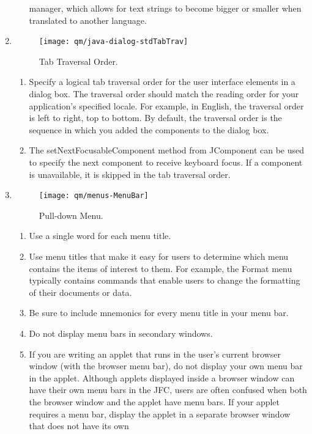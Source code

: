 \begin{enumerate}
\begin{enumerate}
  manager, which allows for text strings to become bigger or smaller when
  translated to another language.
\end{enumerate}
\newpage
\item {}
\begin{figure}[H]
\texttt{[image: qm/java-dialog-stdTabTrav]}
\ifslides
\else
\caption{Tab Traversal Order.}
\fi
\end{figure}
\begin{enumerate}
\item  Specify a logical tab traversal order for the user interface elements
  in a dialog box. The traversal order should match the reading order for your
  application's specified locale. For example, in English, the traversal order
  is left to right, top to bottom. By default, the traversal order is the
  sequence in which you added the components to the dialog box.
\item The setNextFocusableComponent method from JComponent can be used to
  specify the next component to receive keyboard focus. If a component is
  unavailable, it is skipped in the tab traversal order.
\end{enumerate}
\newpage
\item {}
\begin{figure}[H]
\centering
\texttt{[image: qm/menus-MenuBar]}
\caption{Pull-down Menu.}
\end{figure}
\begin{enumerate}
\item  Use a single word for each menu title.
\item Use menu titles that make it easy for users to determine which menu
  contains the items of interest to them. For example, the Format menu
  typically contains commands that enable users to change the formatting of
  their documents or data.
\item Be sure to include mnemonics for every menu title in your menu bar.
\item Do not display menu bars in secondary windows.
\item If you are writing an applet that runs in the user's current browser
  window (with the browser menu bar), do not display your own menu bar in the
  applet. Although applets displayed inside a browser window can have their
  own menu bars in the JFC, users are often confused when both the browser
  window and the applet have menu bars. If your applet requires a menu bar,
  display the applet in a separate browser window that does not have its own

\end{enumerate}
\end{enumerate}
